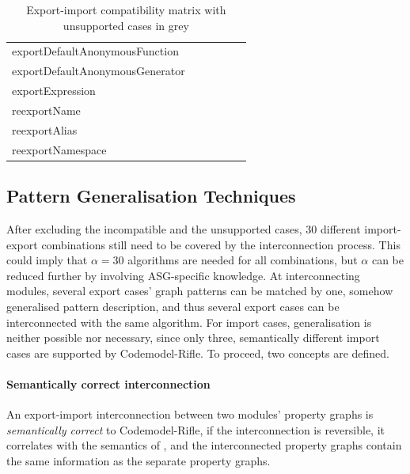 \begin{table}[!htb]
\begin{tabular}{l|cccgg}
		{exportDefaultAnonymousFunction}		& \nop & \nop & \yep & \nop & \yep \\
		\rowcolor{grey}
		{exportDefaultAnonymousGenerator}		& \nop & \nop & \yep & \nop & \yep \\
		{exportExpression}									& \nop & \nop & \nop & \nop & \yep \\
		{reexportName}											& \yep & \yep & \nop & \yep & \yep \\
		\rowcolor{grey}
		{reexportAlias}											& \yep & \yep & \nop & \yep & \yep \\
		{reexportNamespace}									& \yep & \yep & \yep & \yep & \yep \\
		\hline
	\end{tabular}

	\caption{Export-import compatibility matrix with unsupported cases in grey}
	\label{table:export-import-compatibility}
\end{table}


\subsection{Pattern Generalisation Techniques}

After excluding the incompatible and the unsupported cases, $30$ different import-export combinations still need to be covered by the interconnection process. This could imply that $\alpha = 30$ algorithms are needed for all combinations, but $\alpha$ can be reduced further by involving ASG-specific knowledge. At interconnecting modules, several export cases' graph patterns can be matched by one, somehow generalised pattern description, and thus several export cases can be interconnected with the same algorithm. For import cases, generalisation is neither possible nor necessary, since only three, semantically different import cases are supported by Codemodel-Rifle. To proceed, two concepts are defined.

\paragraph{Semantically correct interconnection}

An export-import interconnection between two modules' property graphs is \emph{semantically correct} to Codemodel-Rifle, if the interconnection is reversible, it correlates with the semantics of \es, and the interconnected property graphs contain the same information as the separate property graphs.

